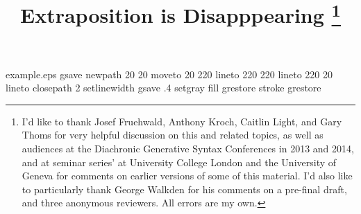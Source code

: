 %
%
%
%
%
\begin{filecontents*}{example.eps}
gsave
newpath
  20 20 moveto
  20 220 lineto
  220 220 lineto
  220 20 lineto
closepath
2 setlinewidth
gsave
  .4 setgray fill
grestore
stroke
grestore
\end{filecontents*}
%
\RequirePackage{fix-cm}
%
\documentclass{svjour3}                     %
%
\smartqed  %
%
\usepackage{mhsetup}
\usepackage{amsmath}
\usepackage{mathtools}
\usepackage{natbib}
\usepackage{graphicx}
\usepackage{float}
\usepackage{qtree}
\usepackage[utf8]{inputenc}
\usepackage{gb4e}
\usepackage[T1]{fontenc}
\usepackage{ tipa }
\usepackage{hyperref}
\usepackage{soul}
\newcommand{\noteme}[1]{\noindent \textbf{[[JCW:  #1 ]]}}
\renewcommand{\theequation}{\Alph{equation}}




\title{Extraposition is Disapppearing
\thanks{I'd like to thank Josef Fruehwald, Anthony Kroch, Caitlin Light, and Gary Thoms for very helpful discussion on this and related topics, as well as audiences at the Diachronic Generative Syntax Conferences in 2013 and 2014, and at seminar series' at University College London and the University of Geneva for comments on earlier versions of some of this material. I'd also like to particularly thank George Walkden for his comments on a pre-final draft, and three anonymous reviewers. All errors are my own.}}

